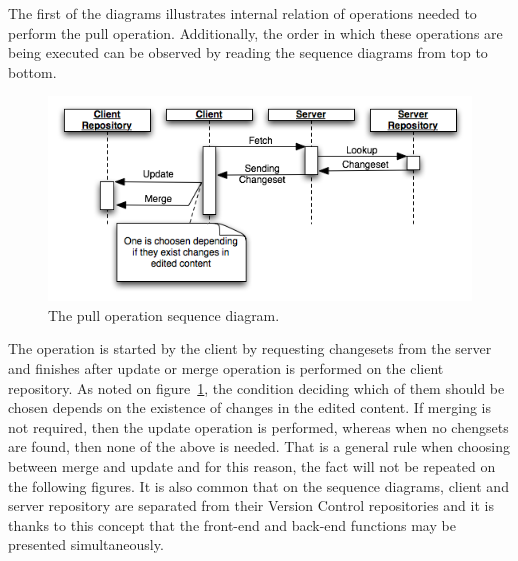 The first of the diagrams illustrates internal relation of operations needed to perform the pull operation. Additionally, the order in which these operations are being executed can be observed by reading the sequence diagrams from top to bottom.
\begin{figure}[ht]
\begin{center}
\includegraphics[scale=0.6]{charts/seq_update.png}
\caption{The pull operation sequence diagram.}
\label{fig:seq_update}
\end{center}
\end{figure}
The operation is started by the client by requesting changesets from the server and finishes after update or merge operation is performed on the client repository. As noted on figure~\ref{fig:seq_update}, the condition deciding which of them should be chosen depends on the existence of changes in the edited content. If merging is not required, then the update operation is performed, whereas when no chengsets are found, then none of the above is needed. That is a general rule when choosing between merge and update and for this reason, the fact will not be repeated on the following figures. It is also common that on the sequence diagrams, client and server repository are separated from their Version Control repositories and it is thanks to this concept that the front-end and back-end functions may be presented simultaneously. 

